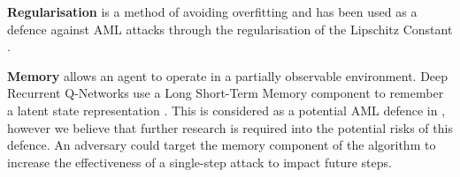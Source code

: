 \documentclass[conference,compsoc]{IEEEtran}
\begin{document}
\noindent \textbf{Regularisation}
is a method of avoiding overfitting and has been used as a defence against AML attacks through the regularisation of the Lipschitz Constant \cite{tang_deep_2019}.

\noindent \textbf{Memory}
allows an agent to operate in a partially observable environment. Deep Recurrent Q-Networks use a Long Short-Term Memory component to remember a latent state representation \cite{hausknecht_deep_2015}. This is considered as a potential AML defence in \cite{russo_optimal_2019}, however we believe that further research is required into the potential risks of this defence. An adversary could target the memory component of the algorithm to increase the effectiveness of a single-step attack to impact future steps.




\end{document}
